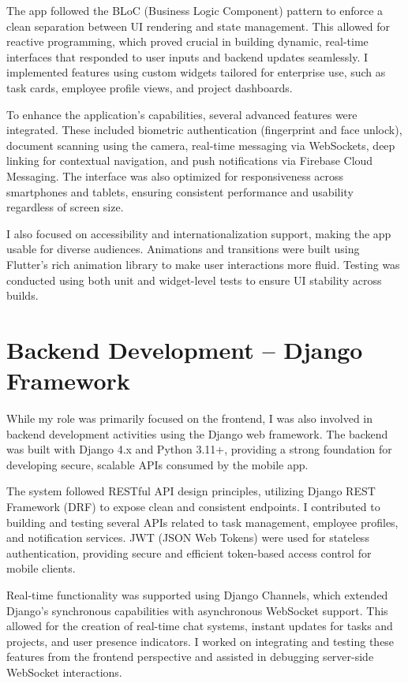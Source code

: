 The app followed the BLoC (Business Logic Component) pattern to enforce a clean separation between UI rendering and state management. This allowed for reactive programming, which proved crucial in building dynamic, real-time interfaces that responded to user inputs and backend updates seamlessly. I implemented features using custom widgets tailored for enterprise use, such as task cards, employee profile views, and project dashboards.

To enhance the application's capabilities, several advanced features were integrated. These included biometric authentication (fingerprint and face unlock), document scanning using the camera, real-time messaging via WebSockets, deep linking for contextual navigation, and push notifications via Firebase Cloud Messaging. The interface was also optimized for responsiveness across smartphones and tablets, ensuring consistent performance and usability regardless of screen size.

I also focused on accessibility and internationalization support, making the app usable for diverse audiences. Animations and transitions were built using Flutter's rich animation library to make user interactions more fluid. Testing was conducted using both unit and widget-level tests to ensure UI stability across builds.

\section{Backend Development – Django Framework}

While my role was primarily focused on the frontend, I was also involved in backend development activities using the Django web framework. The backend was built with Django 4.x and Python 3.11+, providing a strong foundation for developing secure, scalable APIs consumed by the mobile app. 

The system followed RESTful API design principles, utilizing Django REST Framework (DRF) to expose clean and consistent endpoints. I contributed to building and testing several APIs related to task management, employee profiles, and notification services. JWT (JSON Web Tokens) were used for stateless authentication, providing secure and efficient token-based access control for mobile clients.

Real-time functionality was supported using Django Channels, which extended Django’s synchronous capabilities with asynchronous WebSocket support. This allowed for the creation of real-time chat systems, instant updates for tasks and projects, and user presence indicators. I worked on integrating and testing these features from the frontend perspective and assisted in debugging server-side WebSocket interactions.

